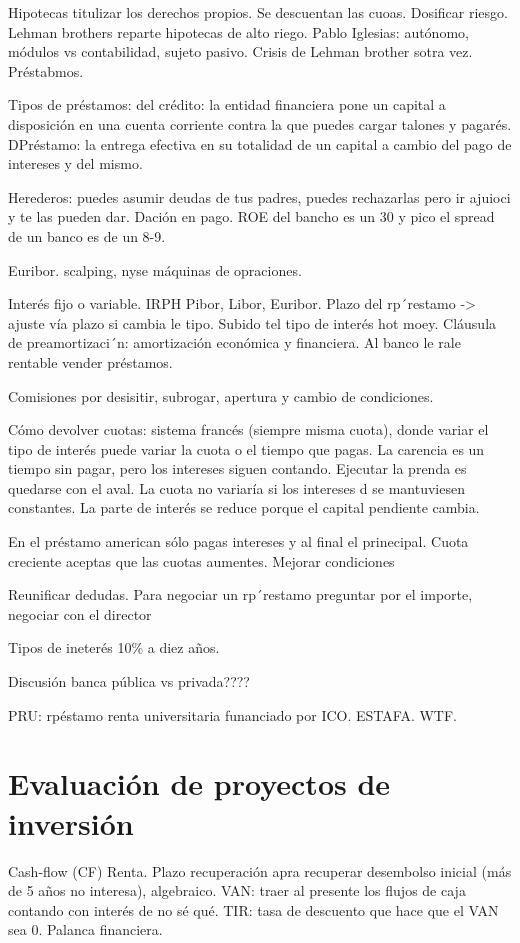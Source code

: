 \documentclass[nochap,palatino,shortheader]{apuntes}
\begin{document}
Hipotecas titulizar los derechos propios. Se descuentan las cuoas. Dosificar riesgo. Lehman brothers reparte hipotecas de alto riego. Pablo Iglesias: autónomo, módulos vs contabilidad, sujeto pasivo. Crisis de Lehman brother sotra vez. Préstabmos.

Tipos de préstamos: del crédito: la entidad financiera pone un capital a disposición en una cuenta corriente contra la que puedes cargar talones y pagarés. DPréstamo: la entrega efectiva en su totalidad de un capital a cambio del pago de intereses y del mismo.

Herederos: puedes asumir deudas de tus padres, puedes rechazarlas pero ir ajuioci y te las pueden dar. Dación en pago. ROE del bancho es un 30 y pico el spread de un banco es de un 8-9.

Euribor.  scalping, nyse máquinas de opraciones.

Interés fijo o variable. IRPH Pibor, Libor, Euribor. Plazo del rp´restamo -> ajuste vía plazo si cambia le tipo. Subido tel tipo de interés hot moey. Cláusula de preamortizaci´n: amortización económica y financiera. Al banco le rale rentable vender préstamos.

Comisiones por desisitir, subrogar, apertura y cambio de condiciones.

Cómo devolver cuotas: sistema francés (siempre misma cuota), donde variar el tipo de interés puede variar la cuota o el tiempo que pagas. La carencia es un tiempo sin pagar, pero los intereses siguen contando. Ejecutar la prenda es quedarse con el aval. La cuota no variaría si los intereses d se mantuviesen constantes. La parte de interés se reduce porque el capital pendiente cambia.

En el préstamo american sólo pagas intereses y al final el prinecipal. Cuota creciente aceptas que las cuotas aumentes. Mejorar condiciones

Reunificar dedudas. Para negociar un rp´restamo preguntar por el importe, negociar con el director

Tipos de ineterés 10\% a diez años.

Discusión banca pública vs privada????

PRU: rpéstamo renta universitaria funanciado por ICO. ESTAFA. WTF.

\section{Evaluación de proyectos de inversión}

Cash-flow (CF) Renta. Plazo recuperación apra recuperar desembolso inicial (más de 5 años no interesa), algebraico. VAN: traer al presente los flujos de caja contando con interés de no sé qué. TIR: tasa de descuento que hace que el VAN sea 0.  Palanca financiera.
\end{document}

